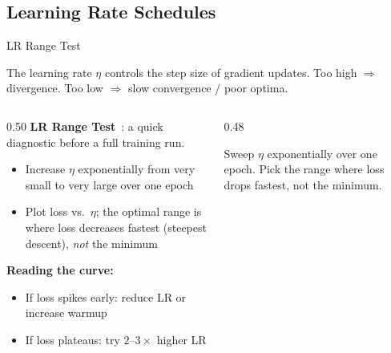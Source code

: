\subsection{Learning Rate Schedules}

\begin{frame}{LR Range Test}

  The learning rate $\eta$ controls the step size of gradient updates.
  Too high $\Rightarrow$ divergence. Too low $\Rightarrow$ slow convergence / poor optima.

  \vspace{0.4em}
  \begin{columns}[T]
    \begin{column}{0.50\textwidth}
      \textbf{LR Range Test}~\cite{smith2017cyclical}: a quick diagnostic before a full training run.
      \begin{itemize}
        \item Increase $\eta$ exponentially from very small to very large over one epoch
        \item Plot loss vs.\ $\eta$; the optimal range is where loss decreases fastest (steepest descent), \emph{not} the minimum
      \end{itemize}

      \medskip
      \textbf{Reading the curve:}
      \begin{itemize}
        \item If loss spikes early: reduce LR or increase warmup
        \item If loss plateaus: try $2\text{--}3\times$ higher LR
      \end{itemize}
    \end{column}
    \begin{column}{0.48\textwidth}
      \begin{center}
      \end{center}
      {\small Sweep $\eta$ exponentially over one epoch. Pick the range where loss drops fastest, not the minimum.}
    \end{column}
  \end{columns}
\end{frame}

